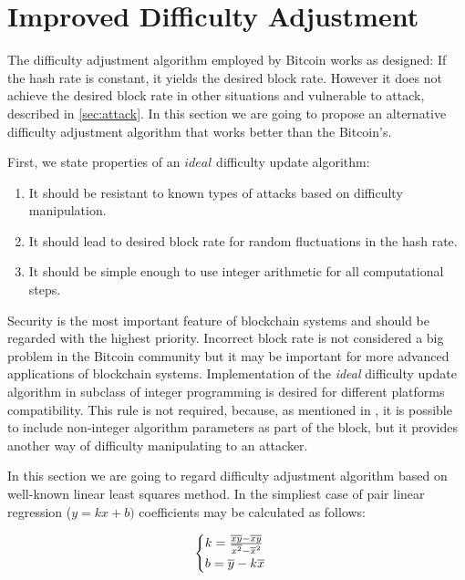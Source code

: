 \documentclass[]{llncs}
\begin{document}
\section{Improved Difficulty Adjustment}
\label{sec:improved}

The difficulty adjustment algorithm employed by Bitcoin works as designed: If the hash rate is constant, it yields the desired block rate. However it does not achieve the desired block rate in other situations and vulnerable to attack, described in \ref{sec:attack}.
In this section we are going to propose an alternative difficulty adjustment algorithm that works better than the Bitcoin's.

First, we state properties of an \(ideal\) difficulty update algorithm:
\begin{enumerate}
\item{It should be resistant to known types of attacks based on difficulty manipulation.}
\item{It should lead to desired block rate for random fluctuations in the hash rate.}
\item{It should be simple enough to use integer arithmetic for all computational steps.}
\end{enumerate}

Security is the most important feature of blockchain systems and should be regarded with the highest priority.
Incorrect block rate is not considered a big problem in the Bitcoin community but it may be important for more advanced applications of blockchain systems.
Implementation of the \textit{ideal} difficulty update algorithm in subclass of integer programming is desired for different platforms compatibility.
This rule is not required, because, as mentioned in \cite{kraft2015difficulty}, it is possible to include non-integer algorithm parameters as part of the block, but it provides another way of difficulty manipulating to an attacker.

In this section we are going to regard difficulty adjustment algorithm based on well-known linear least squares method\cite{lawson1974solving}. In the simpliest case of pair linear regression (\(y=kx+b)\) coefficients may be calculated as follows:

\begin{equation}
  \begin{cases}
    k= {{\overline{xy} - \overline{x}\overline{y}} \over {\overline{x^2} - \overline{x}^2}}  \\
    b= \overline{y}-k\overline{x}
  \end{cases}
\end{equation}
\end{document}
